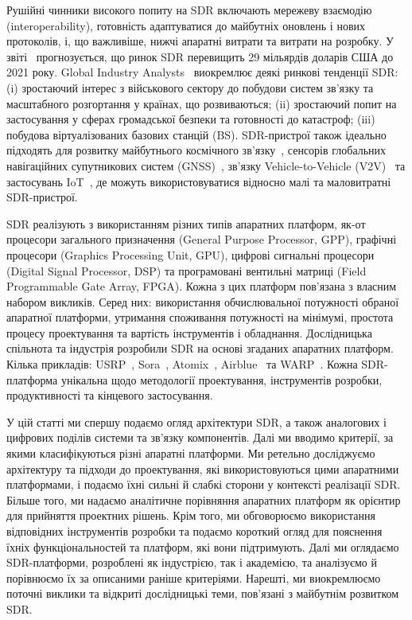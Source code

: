 \documentclass[journal]{IEEEtran}
\begin{document}
Рушійні чинники високого попиту на SDR включають мережеву взаємодію (interoperability), готовність адаптуватися до майбутніх оновлень і нових протоколів, і, що важливіше, нижчі апаратні витрати та витрати на розробку.
У звіті~\cite{reportbuyer2016} прогнозується, що ринок SDR перевищить 29 мільярдів доларів США до 2021 року.
Global Industry Analysts~\cite{sdr_report2017} виокремлює деякі ринкові тенденції SDR: (i) зростаючий інтерес з військового сектору до побудови систем зв'язку та масштабного розгортання у країнах, що розвиваються; (ii) зростаючий попит на застосування у сферах громадської безпеки та готовності до катастроф; (iii) побудова віртуалізованих базових станцій (BS).
SDR-пристрої також ідеально підходять для розвитку майбутнього космічного зв'язку~\cite{Paillassa,Angeletti2008,Angeletti2014}, сенсорів глобальних навігаційних супутникових систем (GNSS)~\cite{Seo2011}, зв'язку Vehicle-to-Vehicle (V2V)~\cite{Xiang2015,Singh2014a,Kloc2017B} та застосувань IoT~\cite{Chen2016,Park2017}, де можуть використовуватися відносно малі та маловитратні SDR-пристрої.

SDR реалізують з використанням різних типів апаратних платформ, як-от процесори загального призначення (General Purpose Processor, GPP), графічні процесори (Graphics Processing Unit, GPU), цифрові сигнальні процесори (Digital Signal Processor, DSP) та програмовані вентильні матриці (Field Programmable Gate Array, FPGA).
Кожна з цих платформ пов'язана з власним набором викликів.
Серед них: використання обчислювальної потужності обраної апаратної платформи, утримання споживання потужності на мінімумі, простота процесу проектування та вартість інструментів і обладнання.
Дослідницька спільнота та індустрія розробили SDR на основі згаданих апаратних платформ.
Кілька прикладів: USRP~\cite{usrp}, Sora~\cite{Tan2011}, Atomix~\cite{Bansal2015}, Airblue~\cite{Ng2010} та WARP~\cite{warp}.
Кожна SDR-платформа унікальна щодо методології проектування, інструментів розробки, продуктивності та кінцевого застосування.


У цій статті ми спершу подаємо огляд архітектури SDR, а також аналогових і цифрових поділів системи та зв'язку компонентів.
Далі ми вводимо критерії, за якими класифікуються різні апаратні платформи.
Ми ретельно досліджуємо архітектуру та підходи до проектування, які використовуються цими апаратними платформами, і подаємо їхні сильні й слабкі сторони у контексті реалізації SDR.
Більше того, ми надаємо аналітичне порівняння апаратних платформ як орієнтир для прийняття проектних рішень.
Крім того, ми обговорюємо використання відповідних інструментів розробки та подаємо короткий огляд для пояснення їхніх функціональностей та платформ, які вони підтримують.
Далі ми оглядаємо SDR-платформи, розроблені як індустрією, так і академією, та аналізуємо й порівнюємо їх за описаними раніше критеріями.
Нарешті, ми виокремлюємо поточні виклики та відкриті дослідницькі теми, пов'язані з майбутнім розвитком SDR.
\end{document}
